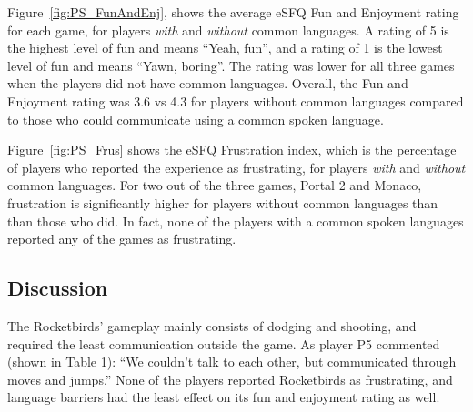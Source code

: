 
Figure~\ref{fig:PS_FunAndEnj}, shows the average eSFQ Fun and Enjoyment rating for each game, for players \textit{with} and \textit{without} common languages. 
A rating of 5 is the highest level of fun and means ``Yeah, fun'', and a rating of 1 is the lowest level of fun and means ``Yawn, boring''.
The rating was lower for all three games when the players did not have common languages. Overall, the Fun and Enjoyment rating was 3.6 vs 4.3 for players without common languages compared to those who could communicate using a common spoken language.

Figure~\ref{fig:PS_Frus} shows the eSFQ Frustration index, which is the percentage of players who reported the experience as frustrating, for players \textit{with} and \textit{without} common languages.
For two out of the three games, Portal 2 and Monaco, frustration is significantly higher for players without common languages than than those who did. In fact, none of the players with a common spoken languages reported any of the games as frustrating. 


\subsection{Discussion}

The Rocketbirds' gameplay mainly consists of dodging and shooting, and required the least communication outside the game. As player P5 commented (shown in Table 1): ``We couldn't talk to each other, but communicated through moves and jumps.'' 
None of the players reported Rocketbirds as frustrating, and language barriers had the least effect on its fun and enjoyment rating as well.

